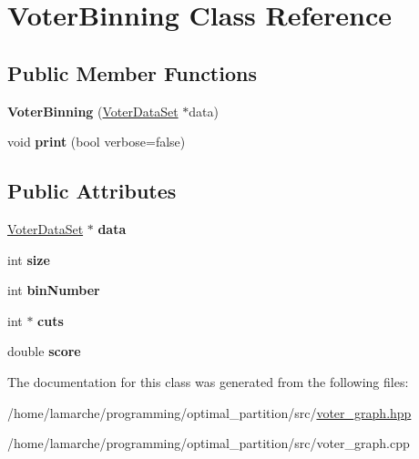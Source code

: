 \hypertarget{classVoterBinning}{\section{Voter\-Binning Class Reference}
\label{classVoterBinning}
}
\subsection*{Public Member Functions}
\begin{DoxyCompactItemize}
\item 
\hypertarget{classVoterBinning_a4626ce3a1bb1aa2108afcfd63af89305}{{\bfseries Voter\-Binning} (\hyperlink{classVoterDataSet}{Voter\-Data\-Set} $\ast$data)}\label{classVoterBinning_a4626ce3a1bb1aa2108afcfd63af89305}

\item 
\hypertarget{classVoterBinning_acf647389a12d6e0838fec89eee8df72e}{void {\bfseries print} (bool verbose=false)}\label{classVoterBinning_acf647389a12d6e0838fec89eee8df72e}

\end{DoxyCompactItemize}
\subsection*{Public Attributes}
\begin{DoxyCompactItemize}
\item 
\hypertarget{classVoterBinning_abfb5cba676d4523a0db4253da90defd4}{\hyperlink{classVoterDataSet}{Voter\-Data\-Set} $\ast$ {\bfseries data}}\label{classVoterBinning_abfb5cba676d4523a0db4253da90defd4}

\item 
\hypertarget{classVoterBinning_a301ba12a243476ac1b7f7bdaa2bdf4b4}{int {\bfseries size}}\label{classVoterBinning_a301ba12a243476ac1b7f7bdaa2bdf4b4}

\item 
\hypertarget{classVoterBinning_a58e6aa4792f0b7f22794597742eb44a6}{int {\bfseries bin\-Number}}\label{classVoterBinning_a58e6aa4792f0b7f22794597742eb44a6}

\item 
\hypertarget{classVoterBinning_a5226a976c3ac9a43e9ed485d9de2712a}{int $\ast$ {\bfseries cuts}}\label{classVoterBinning_a5226a976c3ac9a43e9ed485d9de2712a}

\item 
\hypertarget{classVoterBinning_a9d385619fee2689a5530cc8e06f44d37}{double {\bfseries score}}\label{classVoterBinning_a9d385619fee2689a5530cc8e06f44d37}

\end{DoxyCompactItemize}


The documentation for this class was generated from the following files\-:\begin{DoxyCompactItemize}
\item 
/home/lamarche/programming/optimal\-\_\-partition/src/\hyperlink{voter__graph_8hpp}{voter\-\_\-graph.\-hpp}\item 
/home/lamarche/programming/optimal\-\_\-partition/src/voter\-\_\-graph.\-cpp\end{DoxyCompactItemize}
